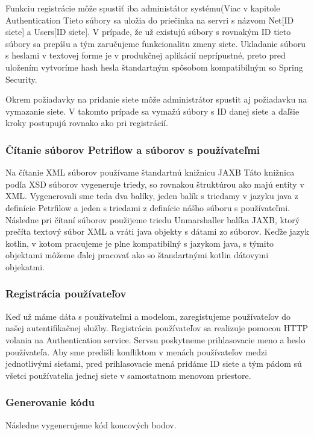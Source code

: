 Funkciu registrácie môže spustiť iba administátor systému(Viac v kapitole Authentication %
Tieto súbory sa uložia do priečinka na servri s názvom Net[ID siete] a Users[ID siete]. V prípade, že už existujú súbory s rovnakým ID tieto súbory sa prepíšu a tým zaručujeme funkcionalitu zmeny siete. 
Ukladanie súboru s heslami v textovej forme je v produkčnej aplikácií neprípustné, preto pred uložením vytvoríme hash hesla štandartným spôsobom kompatibilným so Spring Security.

Okrem požiadavky na pridanie siete môže administrátor spustit aj požiadavku na vymazanie siete. V takomto prípade sa vymažú súbory s ID danej siete a ďaľšie kroky postupujú rovnako ako pri registrácií.


\subsubsection{Čítanie súborov Petriflow a súborov s používateľmi}
Na čítanie XML súborov používame štandartnú knižnicu JAXB \cite{jaxb} %
Táto knižnica podľa XSD súborov vygeneruje triedy, so rovnakou štruktúrou ako majú entity v XML.
Vygenerovali sme teda dva balíky, jeden balík s triedamy v jazyku java z definície Petrfilow a jeden s triedami z definície nášho súboru s používateľmi. 
Následne pri čítaní súborov použijeme triedu Unmarshaller balíka JAXB, ktorý prečíta textový súbor XML a vráti java objekty s dátami zo súborov. Keďže jazyk kotlin, v kotom pracujeme je plne kompatibilný s jazykom java, s týmito objektami môžeme ďalej pracovať ako so štandartnými kotlin dátovymi objekatmi.

\subsubsection{Registrácia používateľov}
Keď už máme dáta s používateľmi a modelom, zaregistujeme používateľov do našej autentifikačnej služby.
Registrácia používateľov sa realizuje pomocou HTTP volania na Authentication service. Servsu poskytneme prihlasovacie meno a heslo používateľa. Aby sme predišli konfliktom v menách používateľov medzi jednotlivými sieťami, pred prihlasovacie mená pridáme ID siete a tým pádom sú všetci používatelia jednej siete v samostatnom menovom priestore.

\subsubsection{Generovanie kódu}
Následne vygenerujeme kód koncových bodov.  


